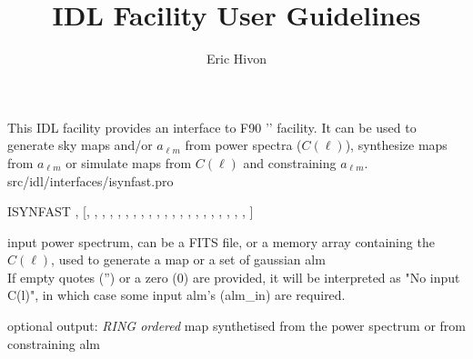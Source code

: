 
\sloppy

\title{\healpix IDL Facility User Guidelines}
 \section[isynfast]{ }
\label{idl:isynfast}
\author{Eric Hivon}

\begin{facility}
{This IDL facility provides an interface to F90 '' facility. It can be
used to generate sky maps and/or $a_{\ell m}$ from power spectra ($C(\ell)$), synthesize maps from
$a_{\ell m}$ or simulate maps from $C(\ell)$ and constraining $a_{\ell m}$.}
{src/idl/interfaces/isynfast.pro}
\end{facility}

\begin{IDLformat}
{ISYNFAST%
, %
 [, %
,
,  %
, %
, %
, %
, %
, %
, %
,
, %
, %
, %
, %
, %
, %
,
, %
, %
, %
, %
]}
\end{IDLformat}

\begin{qualifiers}
  \begin{qulist}{} %
   \item[cl\_in\mytarget{idl:isynfast:cl_in}%
] input power spectrum, can be a FITS file, or a memory array containing the
        $C(\ell)$, used to generate a map or a set of gaussian alm \\
   If empty quotes ('') or a zero (0) are provided, it will be interpreted as "No input C(l)", in
   which case some input alm's (alm\_in) are required.
    \item[map\_out\mytarget{idl:isynfast:map_out}%
] optional output: {\em RING ordered} map synthetised from the power spectrum or from constraining alm
  \end{qulist}
\end{qualifiers}

